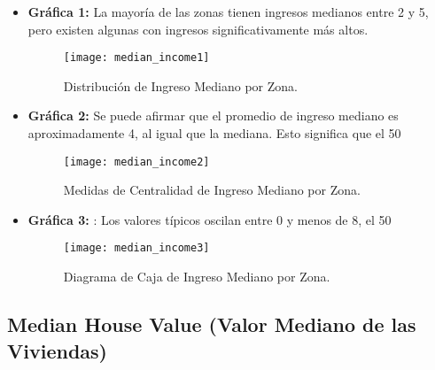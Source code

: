 \documentclass[a4paper, 10pt]{article}
\begin{document}
\begin{itemize}
    \item \textbf{Gráfica 1:} La mayoría de las zonas tienen ingresos medianos entre 2 y 5, pero existen algunas con ingresos significativamente más altos.
    \begin{figure}[H]
        \centering
        \texttt{[image: median\_income1]}
        \caption{Distribución de Ingreso Mediano por Zona.}
    \end{figure}

    \item \textbf{Gráfica 2:} Se puede afirmar que el promedio de ingreso mediano es aproximadamente 4, al igual que la mediana. Esto significa que el 50%
    \begin{figure}[H]
        \centering
        \texttt{[image: median\_income2]}
        \caption{Medidas de Centralidad de Ingreso Mediano por Zona.}
    \end{figure}

    \item \textbf{Gráfica 3:} : Los valores típicos oscilan entre 0 y menos de 8, el 50%
    \begin{figure}[H]
        \centering
        \texttt{[image: median\_income3]}
        \caption{Diagrama de Caja de Ingreso Mediano por Zona.}
    \end{figure}
\end{itemize}

\subsection{Median House Value (Valor Mediano de las Viviendas)}
\end{document}
